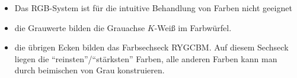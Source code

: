 \begin{itemize}
 \item Das RGB-System ist für die intuitive Behandlung von Farben nicht geeignet
 \item die Grauwerte bilden die Grauachse $K$-Weiß im Farbwürfel.
 \item die übrigen Ecken bilden das Farbsechseck RYGCBM. Auf diesem Sechseck liegen die "`reinsten"'/"`stärksten"'
	Farben, alle anderen Farben kann man durch beimischen von Grau konstruieren.
\end{itemize}